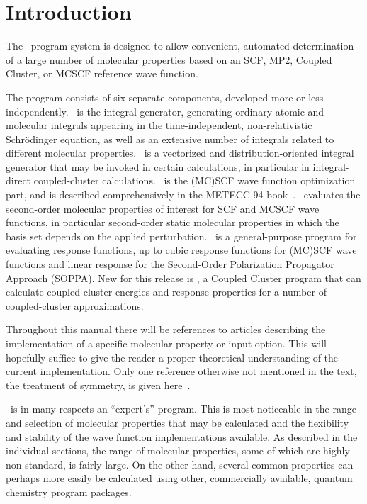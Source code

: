 \chapter{Introduction}\label{ch:intro}

The \dalton\ program system is designed to allow convenient,
automated determination of a large number of molecular properties
based on an SCF, MP2, Coupled Cluster, or MCSCF reference wave
function.

 The program consists
of six separate components, developed more or less independently.
\her\ is the integral generator, generating ordinary
atomic and molecular integrals appearing
in the time-independent, non-relativistic Schr\"{o}dinger
equation, as well as an extensive number of integrals related to
different molecular properties. \eri\ is a vectorized and
distribution-oriented integral generator that may be invoked in
certain calculations, in particular in integral-direct coupled-cluster
calculations. \sir\ is the (MC)SCF wave function 
optimization part, and is described comprehensively in the
METECC-94 book~\cite{hjajhajomotecc}. \aba\ evaluates the
second-order molecular properties of interest for SCF and MCSCF wave
functions, in particular second-order static molecular properties in
which the basis set depends on the applied perturbation. \resp\ is a
general-purpose program for evaluating response functions, up to cubic
response functions for (MC)SCF wave functions and linear response for
the Second-Order Polarization Propagator Approach (SOPPA). New for
this release is {\cc}, a Coupled Cluster program that can calculate
coupled-cluster energies and response properties for a number of
coupled-cluster approximations. 

Throughout this manual there will be references to articles
describing the implementation of a specific molecular property or
input option. This will hopefully suffice to give the reader a proper
theoretical understanding of the current implementation. Only one
reference otherwise not mentioned in the text, the treatment of
symmetry, is given here~\cite{prttca69}.

\dalton\ is in many respects an ``expert's'' program. This is most
noticeable in the range and selection of molecular properties that may
be calculated and the flexibility and stability of the wave function
implementations available. As described in the individual sections, the range of
molecular properties, some of which are highly non-standard, is fairly
large. On the other hand, several common properties can perhaps more
easily be calculated using other, commercially available, quantum
chemistry program packages.

